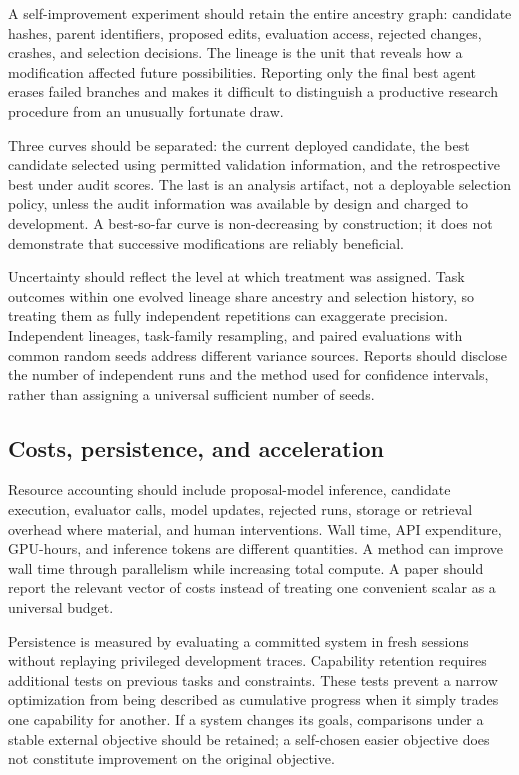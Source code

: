 \documentclass[11pt,american,]{article}
\begin{document}
A self-improvement experiment should retain the entire ancestry graph:
candidate hashes, parent identifiers, proposed edits, evaluation access,
rejected changes, crashes, and selection decisions. The lineage is the
unit that reveals how a modification affected future possibilities.
Reporting only the final best agent erases failed branches and makes it
difficult to distinguish a productive research procedure from an
unusually fortunate draw.

Three curves should be separated: the current deployed candidate, the
best candidate selected using permitted validation information, and the
retrospective best under audit scores. The last is an analysis artifact,
not a deployable selection policy, unless the audit information was
available by design and charged to development. A best-so-far curve is
non-decreasing by construction; it does not demonstrate that successive
modifications are reliably beneficial.

Uncertainty should reflect the level at which treatment was assigned.
Task outcomes within one evolved lineage share ancestry and selection
history, so treating them as fully independent repetitions can
exaggerate precision. Independent lineages, task-family resampling, and
paired evaluations with common random seeds address different variance
sources. Reports should disclose the number of independent runs and the
method used for confidence intervals, rather than assigning a universal
sufficient number of seeds.

\hypertarget{costs-persistence-and-acceleration}{%
\subsection{Costs, persistence, and
acceleration}\label{costs-persistence-and-acceleration}}

Resource accounting should include proposal-model inference, candidate
execution, evaluator calls, model updates, rejected runs, storage or
retrieval overhead where material, and human interventions. Wall time,
API expenditure, GPU-hours, and inference tokens are different
quantities. A method can improve wall time through parallelism while
increasing total compute. A paper should report the relevant vector of
costs instead of treating one convenient scalar as a universal budget.

Persistence is measured by evaluating a committed system in fresh
sessions without replaying privileged development traces. Capability
retention requires additional tests on previous tasks and constraints.
These tests prevent a narrow optimization from being described as
cumulative progress when it simply trades one capability for another. If
a system changes its goals, comparisons under a stable external
objective should be retained; a self-chosen easier objective does not
constitute improvement on the original objective.
\end{document}

